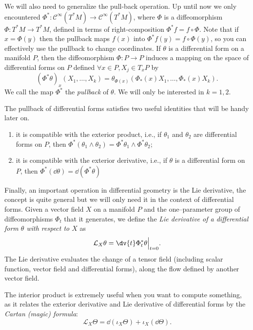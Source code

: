 \documentclass[english,fontsize=11pt,paper=b5]{scrbook}
\theoremstyle{definition}
\begin{document}
    We will also need to generalize the pull-back operation.
    Up until now we only encountered $\Phi^* : \mathcal{C}^\infty(T^*M) \to \mathcal{C}^\infty(T^*M)$, where $\Phi$ is a diffeomorphism $\Phi: T^*M \to T^*M$, defined in terms of right-composition $\Phi^* f = f \circ \Phi$.
    Note that if $x = \Phi(y)$ then the pullback maps $f(x)$ into $\Phi^* f (y) = f \circ \Phi (y)$, so you can effectively use the pullback to change coordinates.
    If $\theta$ is a differential form on a manifold $P$, then the diffeomorphism $\Phi : P \to P$ induces a mapping on the space of differential forms on $P$ defined $\forall x\in P, X_j\in T_xP$ by
    \begin{equation}
      (\Phi^{*}\theta)_{x}(X_{1},\ldots ,X_{k})=\theta_{\Phi(x)}(\Phi_*(x)X_{1},\ldots,\Phi_*(x)X_{k}).
    \end{equation}
    We call the map $\Phi^*$ the \emph{pullback} of $\theta$. We will only be interested in $k=1,2$.

    The pullback of differential forms satisfies two useful identities that will be handy later on.
    \begin{enumerate}
      \item it is compatible with the exterior product, i.e., if $\theta_1$ and $\theta_2$ are differential forms on $P$, then $\Phi^{*}(\theta_1 \wedge \theta_2) = \Phi^{*}\theta_1 \wedge \Phi^{*}\theta_2$;
      \item it is compatible with the exterior derivative, i.e., if $\theta$ is a differential form on $P$, then $\Phi^{*}(\dd\theta) = \dd(\Phi^{*}\theta)$
    \end{enumerate}

    Finally, an important operation in differential geometry is the Lie derivative, the concept is quite general but we will only need it in the context of differential forms.
    Given a vector field $X$ on a manifold $P$ and the one--parameter group of diffeomorphisms $\Phi_t$ that it generates, we define the \emph{Lie derivative of a differential form $\theta$ with respect to $X$} as
    \begin{equation}\label{eq:lie-derivative}
      \mathcal{L}_X \theta = \dv{t}\Phi_t^*\theta \Big|_{t=0}.
    \end{equation}
    The Lie derivative evaluates the change of a tensor field (including scalar function, vector field and differential forms), along the flow defined by another vector field.

    The interior product is extremely useful when you want to compute something, as it relates the exterior derivative and Lie derivative of differential forms by the \emph{Cartan (magic) formula}:
    \begin{equation}\label{eq:cartan}
      \mathcal{L}_X \Theta = \dd(\iota_X \Theta) + \iota_X (\dd{\Theta}).
    \end{equation}
\end{document}
